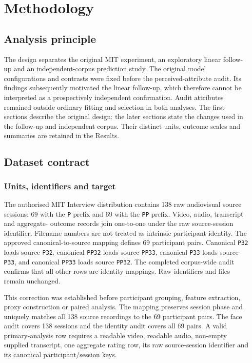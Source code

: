 \chapter{Methodology}
\label{ch:methodology}

\section{Analysis principle}

The design separates the original MIT experiment, an exploratory linear follow-up and an
independent-corpus prediction study. The original model configurations and contrasts were
fixed before the perceived-attribute audit. Its findings subsequently motivated the linear
follow-up, which therefore cannot be interpreted as a prospectively independent confirmation.
Audit attributes remained outside ordinary fitting and selection in both analyses. The first
sections describe the original design; the later sections state the changes used in the
follow-up and independent corpus. Their distinct units, outcome scales and summaries are
retained in the Results.

\section{Dataset contract}

\subsection{Units, identifiers and target}

The authorised MIT Interview distribution contains 138 raw audiovisual source sessions: 69 with
the \texttt{P} prefix and 69 with the \texttt{PP} prefix. Video, audio, transcript and aggregate-
outcome records join one-to-one under the raw source-session identifier. Filename numbers are not
treated as intrinsic participant identity. The approved canonical-to-source mapping defines 69
participant pairs. Canonical \texttt{P32} loads source \texttt{P32}, canonical \texttt{PP32}
loads source \texttt{PP33}, canonical \texttt{P33} loads source \texttt{P33}, and canonical
\texttt{PP33} loads source \texttt{PP32}. The completed corpus-wide audit confirms that all other
rows are identity mappings. Raw identifiers and files remain
unchanged.

This correction was established before participant grouping, feature extraction, proxy
construction or paired analysis. The mapping preserves session phase and uniquely matches all
138 source recordings to the 69 participant pairs. The face audit covers 138 sessions and the
identity audit covers all 69 pairs. A valid primary-analysis row requires a
readable video, readable audio, non-empty supplied transcript, one aggregate rating row, its raw
source-session identifier and its canonical participant/session keys.

